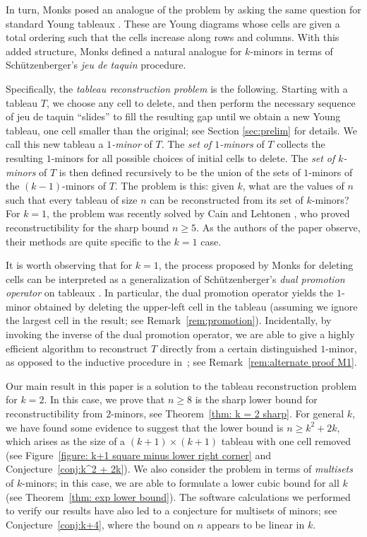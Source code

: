 \documentclass[12pt]{amsart}
\theoremstyle{definition}
\theoremstyle{remark}
\numberwithin{equation}{section}
\numberwithin{figure}{section}
\begin{document}
In turn, Monks posed an analogue of the problem by asking the same question for standard Young tableaux \cite[Section 4.3]{Monks2009}.  These are Young diagrams whose cells are given a total ordering such that the cells increase along rows and columns.  With this added structure, Monks defined a natural analogue for $k$-minors in terms of Sch\"utzenberger's \emph{jeu de taquin} procedure.

Specifically, the \emph{tableau reconstruction problem} is the following.  Starting with a tableau $T$, we choose any cell to delete, and then perform the necessary sequence of jeu de taquin ``slides'' to fill the resulting gap until we obtain a new Young tableau, one cell smaller than the original; see Section \ref{sec:prelim} for details. We call this new tableau a \emph{$1$-minor} of $T$.  The \emph{set of $1$-minors} of $T$ collects the resulting $1$-minors for all possible choices of initial cells to delete.  The \emph{set of $k$-minors} of $T$ is then defined recursively to be the union of the sets of $1$-minors of the $(k-1)$-minors of $T$.  The problem is this: given $k$, what are the values of $n$ such that every tableau of size $n$ can be reconstructed from its set of $k$-minors?  For $k=1$, the problem was recently solved by Cain and Lehtonen \cite{CainLehtonen2022}, who proved reconstructibility for the sharp bound $n \geq 5$.  As the authors of the paper observe, their methods are quite specific to the $k=1$ case.

It is worth observing that for $k=1$, the process proposed by Monks for deleting cells can be interpreted as a generalization of Schüt\-zen\-ber\-ger's \emph{dual promotion operator} on tableaux \cite{Schutzenberger1972}.  In particular, the dual promotion  operator yields the $1$-minor obtained by deleting the upper-left cell in the tableau (assuming we ignore the largest cell in the result; see Remark~\ref{rem:promotion}).  Incidentally, by invoking the inverse of the dual promotion operator, we are able to give a highly efficient algorithm to reconstruct $T$ directly from a certain distinguished $1$-minor, as opposed to the inductive procedure in~\cite{CainLehtonen2022}; see Remark~\ref{rem:alternate proof M1}.

Our main result in this paper is a solution to the tableau reconstruction problem for $k = 2$.  In this case, we prove that $n \geq 8$ is the sharp lower bound for reconstructibility from $2$-minors, see Theorem~\ref{thm: k = 2 sharp}. For general $k$, we have found some evidence to suggest that the lower bound is $n \geq k^2 + 2k$, which arises as the size of a $(k+1) \times (k+1)$ tableau with one cell removed (see Figure~\ref{figure: k+1 square minus lower right corner} and Conjecture~\ref{conj:k^2 + 2k}).  We also consider the problem in terms of \emph{multisets} of $k$-minors; in this case, we are able to formulate a lower cubic bound for all $k$ (see Theorem~\ref{thm: exp lower bound}).  The software calculations we performed to verify our results have also led to a conjecture for multisets of minors; see Conjecture~\ref{conj:k+4}, where the bound on $n$ appears to be linear in $k$.
\end{document}
